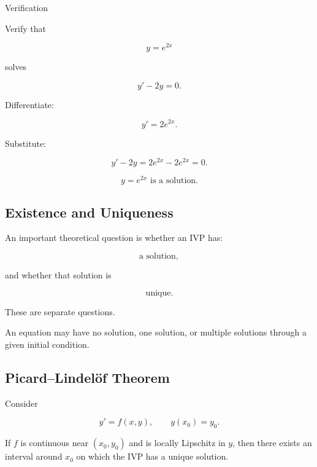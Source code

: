 \begin{workedexamplebox}{Verification}

Verify that

\[
y=e^{2x}
\]

solves

\[
y'-2y=0.
\]

Differentiate:

\[
y'
=
2e^{2x}.
\]

Substitute:

\[
y'-2y
=
2e^{2x}
-
2e^{2x}
=
0.
\]

\begin{answerbox}
\[
\boxed{
y=e^{2x}
\text{ is a solution.}
}
\]
\end{answerbox}

\end{workedexamplebox}

\subsection{Existence and Uniqueness}
\label{subsec:ode-existence-uniqueness}

An important theoretical question is whether an IVP has:

\[
\boxed{
\text{a solution},
}
\]

and whether that solution is

\[
\boxed{
\text{unique}.
}
\]

These are separate questions.

An equation may have no solution, one solution, or multiple solutions
through a given initial condition.

\subsection{Picard--Lindelöf Theorem}
\label{subsec:picard-lindelof}

\begin{theorem}
Consider

\[
y'=f(x,y),
\qquad
y(x_0)=y_0.
\]

If \(f\) is continuous near \((x_0,y_0)\) and is locally Lipschitz in
\(y\), then there exists an interval around \(x_0\) on which the IVP has
a unique solution.
\end{theorem}

